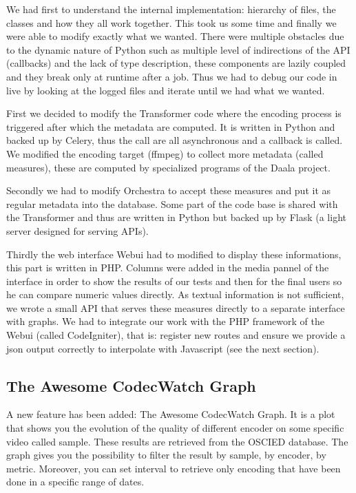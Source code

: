 \documentclass[a4paper,12pt]{article}
\begin{document}
We had first to understand the internal implementation: hierarchy of files, the classes and how they all work together.
This took us some time and finally we were able to modify exactly what we wanted.
There were multiple obstacles due to the dynamic nature of Python such as multiple level of indirections of the API (callbacks) and the lack of type description, these components are lazily coupled and they break only at runtime after a job.
Thus we had to debug our code in live by looking at the logged files and iterate until we had what we wanted.

First we decided to modify the Transformer code where the encoding process is triggered after which the metadata are computed.
It is written in Python and backed up by Celery, thus the call are all asynchronous and a callback is called.
We modified the encoding target (ffmpeg) to collect more metadata (called measures), these are computed by specialized programs of the Daala project.

Secondly we had to modify Orchestra to accept these measures and put it as regular metadata into the database. Some part of the code base is shared with the Transformer and thus are written in Python but backed up by Flask (a light server designed for serving APIs).

Thirdly the web interface Webui had to modified to display these informations, this part is written in PHP.
Columns were added in the media pannel of the interface in order to show the results of our tests and then for the final users so he can compare numeric values directly.
As textual information is not sufficient, we wrote a small API that serves these measures directly to a separate interface with graphs.
We had to integrate our work with the PHP framework of the Webui (called CodeIgniter), that is: register new routes and ensure we provide a json output correctly to interpolate with Javascript (see the next section).

\subsection{The Awesome CodecWatch Graph}
A new feature has been added: The Awesome CodecWatch Graph. It is a plot that shows you the evolution of the quality of different encoder on some specific video called sample. These results are retrieved from the OSCIED database. The graph gives you the possibility to filter the result by sample, by encoder, by metric. Moreover, you can set interval to retrieve only encoding that have been done in a specific range of dates.
\end{document}
